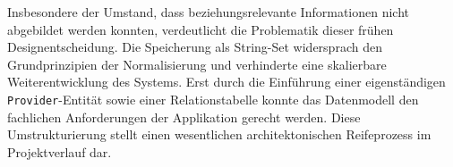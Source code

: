 Insbesondere der Umstand, dass beziehungsrelevante Informationen nicht abgebildet
werden konnten, verdeutlicht die Problematik dieser frühen Designentscheidung.
Die Speicherung als String-Set widersprach den Grundprinzipien der Normalisierung
und verhinderte eine skalierbare Weiterentwicklung des Systems. Erst durch die
Einführung einer eigenständigen \texttt{Provider}-Entität sowie einer
Relationstabelle konnte das Datenmodell den fachlichen Anforderungen der
Applikation gerecht werden. Diese Umstrukturierung stellt einen wesentlichen
architektonischen Reifeprozess im Projektverlauf dar.
